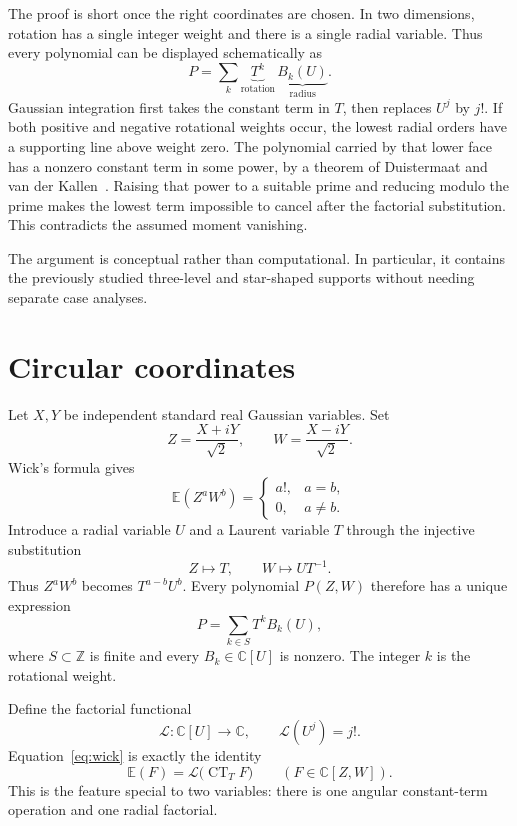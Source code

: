 \documentclass[11pt]{article}
\newcommand{\C}{\mathbb C}
\newcommand{\Z}{\mathbb Z}
\newcommand{\E}{\mathbb E}
\newcommand{\CT}{\operatorname{CT}}
\begin{document}
The proof is short once the right coordinates are chosen.  In two
dimensions, rotation has a single integer weight and there is a single
radial variable.  Thus every polynomial can be displayed schematically as
\[
  P=\sum_k \underbrace{T^k}_{\text{rotation}}\,
                  \underbrace{B_k(U)}_{\text{radius}}.
\]
Gaussian integration first takes the constant term in \(T\), then replaces
\(U^j\) by \(j!\).  If both positive and negative rotational weights occur,
the lowest radial orders have a supporting line above weight zero.  The
polynomial carried by that lower face has a nonzero constant term in some
power, by a theorem of Duistermaat and van der Kallen~\cite{DK}.  Raising
that power to a suitable prime and reducing modulo the prime makes the
lowest term impossible to cancel after the factorial substitution.  This
contradicts the assumed moment vanishing.

The argument is conceptual rather than computational.  In particular, it
contains the previously studied three-level and star-shaped supports
without needing separate case analyses.

\section{Circular coordinates}

Let \(X,Y\) be independent standard real Gaussian variables.  Set
\[
  Z=\frac{X+iY}{\sqrt2},\qquad
  W=\frac{X-iY}{\sqrt2}.
\]
Wick's formula gives
\begin{equation}\label{eq:wick}
  \E(Z^aW^b)=
  \begin{cases}
    a!,&a=b,\\
    0,&a\neq b.
  \end{cases}
\end{equation}
Introduce a radial variable \(U\) and a Laurent variable \(T\) through the
injective substitution
\[
  Z\longmapsto T,\qquad W\longmapsto UT^{-1}.
\]
Thus \(Z^aW^b\) becomes \(T^{a-b}U^b\).  Every polynomial \(P(Z,W)\)
therefore has a unique expression
\begin{equation}\label{eq:weight-decomposition}
  P=\sum_{k\in S}T^kB_k(U),
\end{equation}
where \(S\subset\Z\) is finite and every \(B_k\in\C[U]\) is nonzero.  The
integer \(k\) is the rotational weight.

Define the factorial functional
\[
  \mathcal L:\C[U]\longrightarrow\C,\qquad
  \mathcal L(U^j)=j!.
\]
Equation~\eqref{eq:wick} is exactly the identity
\begin{equation}\label{eq:expectation-factorization}
  \E(F)=\mathcal L\bigl(\CT_T F\bigr)
  \qquad(F\in\C[Z,W]).
\end{equation}
This is the feature special to two variables: there is one angular
constant-term operation and one radial factorial.
\end{document}
